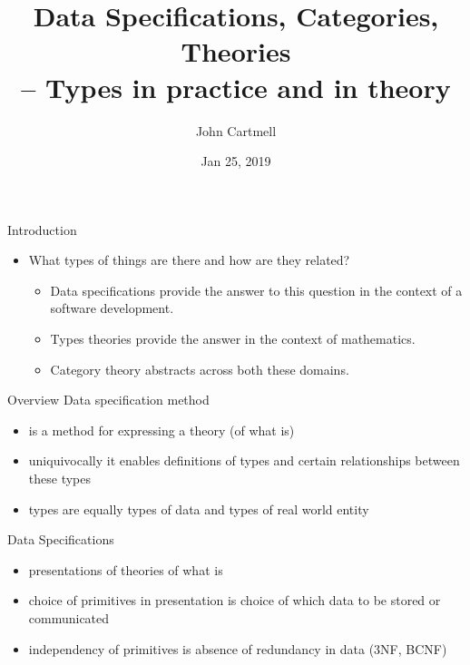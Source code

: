 \documentclass[xcolor=pst,dvips]{beamer}   %
\title[Types in practice and in theory]{Data Specifications, Categories, Theories\\ -- Types in practice and in theory}
\author{John Cartmell}
\institute{Otium}
\date{Jan 25, 2019}
\begin{document}
\begin{frame}
\titlepage
\end{frame}

\iffalse
\AtBeginSubsection[]
{
  \begin{frame}<beamer>
    \frametitle{Layout}
    \tableofcontents[currentsection,currentsubsection]
  \end{frame}
} 
\begin{frame}{Table of Contents}
\tableofcontents
\end{frame}
\fi



\begin{frame}{Introduction}
\begin{itemize}
\item
What types of things are there and how are they related? 
\begin{itemize}
\pause \item Data specifications provide the answer to this question in the context of a software development. 
\pause \item Types theories provide the answer in the context of mathematics. 
\pause \item Category theory abstracts across both these domains.
\end{itemize}
\end{itemize}

\end{frame}
\begin{frame}{Overview}
Data specification method 
\begin{itemize}
\item is a method for expressing a  theory (of what is)
\item uniquivocally it enables definitions of types and certain relationships between these types
\item types are equally types of data and types of real world entity
\end{itemize}
\end{frame}

\begin{frame}{Data Specifications}
\begin{itemize}
\item presentations of theories of what is
\item choice of primitives in presentation is choice of which data to be stored or communicated
\item independency of primitives is absence of redundancy in data (3NF, BCNF)
\end{itemize}
\end{frame}
\end{document}
